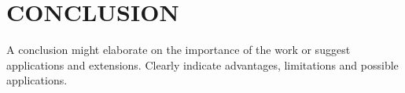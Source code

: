 \documentclass[letterpaper,oneside,onecolumn,draftclsnofoot,12pt,conference]{IEEEtran}
\begin{document}
 		
 		

\section{CONCLUSION}
A conclusion might elaborate on the importance of the work or suggest
applications and extensions. Clearly indicate advantages, limitations and
possible applications.

 		
 






%
%
%




\end{document}
